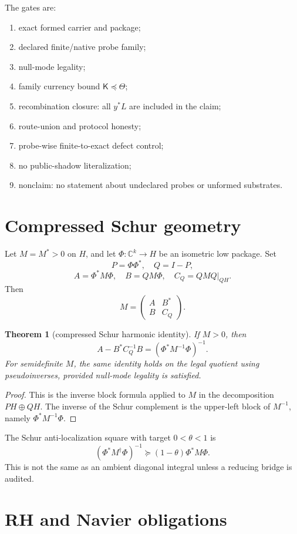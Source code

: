 \documentclass[11pt]{article}
\newtheorem{theorem}{Theorem}[section]
\newcommand{\Kmat}{\mathsf K}
\begin{document}
The gates are:
\begin{enumerate}[label=G\arabic*.]
\item exact formed carrier and package;
\item declared finite/native probe family;
\item null-mode legality;
\item family currency bound $\Kmat\preceq\Theta$;
\item recombination closure: all $y^*L$ are included in the claim;
\item route-union and protocol honesty;
\item probe-wise finite-to-exact defect control;
\item no public-shadow literalization;
\item nonclaim: no statement about undeclared probes or unformed substrates.
\end{enumerate}

\section{Compressed Schur geometry}

Let $M=M^*>0$ on $H$, and let $\Phi:\mathbb C^k\to H$ be an isometric low package.  Set
\[
P=\Phi\Phi^*,\quad Q=I-P,
\]
\[
A=\Phi^*M\Phi,
\quad
B=QM\Phi,
\quad
C_Q=QMQ|_{QH}.
\]
Then
\[
M=\begin{pmatrix} A&B^*\\ B&C_Q\end{pmatrix}.
\]

\begin{theorem}[compressed Schur harmonic identity]
If $M>0$, then
\[
\boxed{A-B^*C_Q^{-1}B=(\Phi^*M^{-1}\Phi)^{-1}.}
\]
For semidefinite $M$, the same identity holds on the legal quotient using pseudoinverses, provided null-mode legality is satisfied.
\end{theorem}

\begin{proof}
This is the inverse block formula applied to $M$ in the decomposition $PH\oplus QH$.  The inverse of the Schur complement is the upper-left block of $M^{-1}$, namely $\Phi^*M^{-1}\Phi$.
\end{proof}

The Schur anti-localization square with target $0<\theta<1$ is
\[
(\Phi^*M^\dagger\Phi)^{-1}\succeq(1-\theta)\Phi^*M\Phi.
\]
This is not the same as an ambient diagonal integral unless a reducing bridge is audited.

\section{RH and Navier obligations}
\end{document}
